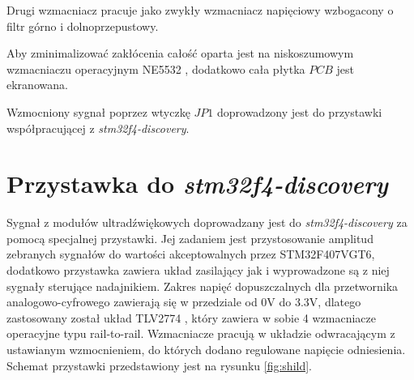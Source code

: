 Drugi wzmacniacz pracuje jako zwykły wzmacniacz napięciowy wzbogacony o filtr górno i dolnoprzepustowy.

Aby zminimalizować zakłócenia całość oparta jest na niskoszumowym wzmacniaczu operacyjnym NE5532 \cite{bib:ne5532}, 
dodatkowo cała płytka $PCB$ jest ekranowana.

Wzmocniony sygnał poprzez wtyczkę $JP1$ doprowadzony jest do przystawki współpracującej z \textit{stm32f4-discovery}.

\clearpage

\section{Przystawka do \textit{stm32f4-discovery}}

Sygnał z modułów ultradźwiękowych doprowadzany jest do \textit{stm32f4-discovery} za pomocą specjalnej przystawki.
Jej zadaniem jest przystosowanie amplitud zebranych sygnałów do wartości akceptowalnych przez STM32F407VGT6,
dodatkowo przystawka zawiera układ zasilający jak i wyprowadzone są z niej sygnały sterujące nadajnikiem.
Zakres napięć dopuszczalnych dla przetwornika analogowo-cyfrowego zawierają się w przedziale od 0V do 3.3V,
dlatego zastosowany został układ TLV2774 \cite{bib:TLV2774}, który zawiera w sobie 4 wzmacniacze operacyjne typu
rail-to-rail. Wzmacniacze pracują w układzie odwracającym z ustawianym wzmocnieniem, do których dodano regulowane napięcie odniesienia.
Schemat przystawki przedstawiony jest na rysunku \ref{fig:shild}.





